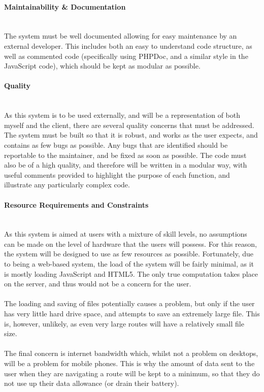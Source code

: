 \paragraph{Maintainability \& Documentation}\ \\
The system must be well documented allowing for easy maintenance by an external developer. This includes both an easy to understand code structure, as well as commented code (specifically using PHPDoc, and a similar style in the JavaScript code), which should be kept as modular as possible.

\paragraph{Quality}\ \\
As this system is to be used externally, and will be a representation of both myself and the client, there are several quality concerns that must be addressed. The system must be built so that it is robust, and works as the user expects, and contains as few bugs as possible. Any bugs that are identified should be reportable to the maintainer, and be fixed as soon as possible. The code must also be of a high quality, and therefore will be written in a modular way, with useful comments provided to highlight the purpose of each function, and illustrate any particularly complex code.

\paragraph{Resource Requirements and Constraints}\ \\
As this system is aimed at users with a mixture of skill levels, no assumptions can be made on the level of hardware that the users will possess. For this reason, the system will be designed to use as few resources as possible. Fortunately, due to being a web-based system, the load of the system will be fairly minimal, as it is mostly loading JavaScript and HTML5. The only true computation takes place on the server, and thus would not be a concern for the user.\ \\
\ \\
The loading and saving of files potentially causes a problem, but only if the user has very little hard drive space, and attempts to save an extremely large file. This is, however, unlikely, as even very large routes will have a relatively small file size.\ \\
\ \\
The final concern is internet bandwidth which, whilst not a problem on desktops, will be a problem for mobile phones. This is why the amount of data sent to the user when they are navigating a route will be kept to a minimum, so that they do not use up their data allowance (or drain their battery).

